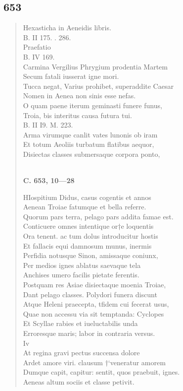 \documentclass[11pt, a4paper]{report}
\begin{document}
            \subsection*{653}
      \begin{verse}
      Hexasticha in Aeneidis libris. \\ B. II 175. . 286. \\ Praefatio \\ B. IV 169. \\ Carmina Vergilius Phrygium prodentia Martem \\ Secum fatali iusserat igne mori. \\ Tucca negat, Varius prohibet, superaddite Caesar \\ Nomen in Aenea non sinis esse nefas. \\ O quam paene iterum geminasti funere funus, \\ Troia, bis interitus causa futura tui. \\ B. II I9. M. 223. \\ Arma virumque canlit vates lunonis ob iram \\ Et totum Aeoliis turbatum flatibus aequor, \\ Disiectas classes submersaque corpora ponto, \\ 
        ﻿\pagebreak 
    \begin{center} \textbf{C. 653, 10—28} \end{center} \marginpar{[122]} HIospitium Didus, casus cogentis et annos \\ Aenean Troiae fatumque et bella referre. \\ Quorum pars terra, pelago pars addita famae est. \\ Conticuere omnes intentique or†e loquentis \\ Ora tenent. ac tum dolus introducitur hostis \\ Et fallacis equi damnosum munus, inermis \\ Perfidia notusque Sinon, amissaque coniunx, \\ Per medios ignes ablatus saevaque tela \\ Anchises umero facilis pietate ferentis. \\ Postquam res Asiae \rbrack  disiectaque moenia Troiae, \\ Dant pelago classes. Polydori funera discunt \\ Atque Heleni praecepta, tfidem cui fecerat usus, \\ Quae non accessu via sit temptanda: Cyclopes \\ Et Scyllae rabies et iueluctabilis unda \\ Erroresque maris; labor in contraria versus. \\ Iv \\ At regina gravi \rbrack  pectus succensa dolore \\ Ardet amore viri. clausum †‘veneratur amorem \\ Dumque capit, capitur: sentit, quos praebuit, ignes. \\ Aeneas altum sociis et classe petivit. \\ 

\end{verse}
\end{document}
